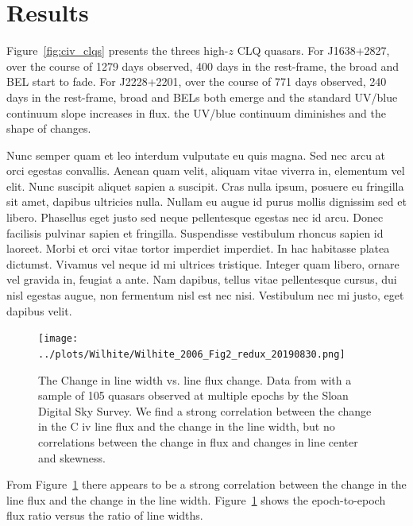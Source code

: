 \documentclass[a4paper,fleqn,usenatbib]{mnras}
\begin{document}
\section{Results}
Figure~\ref{fig:civ_clqs} presents the threes high-$z$ CLQ quasars. 
For J1638+2827, over the course of 1279 days observed, 400 days in the rest-frame, the  broad \civ and \ciii BEL start to fade.  
For J2228+2201, over the course of 771 days observed, 240 days in the rest-frame, broad \civ and \ciii BELs both emerge and the 
standard UV/blue continuum slope increases in flux. 
the UV/blue continuum diminishes and the shape of \lya changes. 

Nunc semper quam et leo interdum vulputate eu quis magna. Sed nec arcu
at orci egestas convallis. Aenean quam velit, aliquam vitae viverra
in, elementum vel elit. Nunc suscipit aliquet sapien a suscipit. Cras
nulla ipsum, posuere eu fringilla sit amet, dapibus ultricies
nulla. Nullam eu augue id purus mollis dignissim sed et
libero. Phasellus eget justo sed neque pellentesque egestas nec id
arcu. Donec facilisis pulvinar sapien et fringilla. Suspendisse
vestibulum rhoncus sapien id laoreet. Morbi et orci vitae tortor
imperdiet imperdiet. In hac habitasse platea dictumst. Vivamus vel
neque id mi ultrices tristique. Integer quam libero, ornare vel
gravida in, feugiat a ante. Nam dapibus, tellus vitae pellentesque
cursus, dui nisl egestas augue, non fermentum nisl est nec
nisi. Vestibulum nec mi justo, eget dapibus velit.


\begin{figure}
  \centering
  \texttt{[image: ../plots/Wilhite/Wilhite\_2006\_Fig2\_redux\_20190830.png]}
   \vspace{-12pt}
  \caption[]{
The Change in \civ line width vs. line flux change. 
Data from \citet{Wilhite2006} with a sample of 105 quasars observed at
multiple epochs by the Sloan Digital Sky Survey. We find a strong
correlation between the change in the C iv line flux and the change in
the line width, but no correlations between the change in flux and
changes in line center and skewness.}
  \label{fig:Wilhite2006_comparison}
\end{figure}
From Figure~\ref{fig:Wilhite2006_comparison} there appears to be a
strong correlation between the change in the line flux and the change
in the line width.  Figure~\ref{fig:Wilhite2006_comparison} shows the
epoch-to-epoch flux ratio versus the ratio of line widths.
\end{document}
